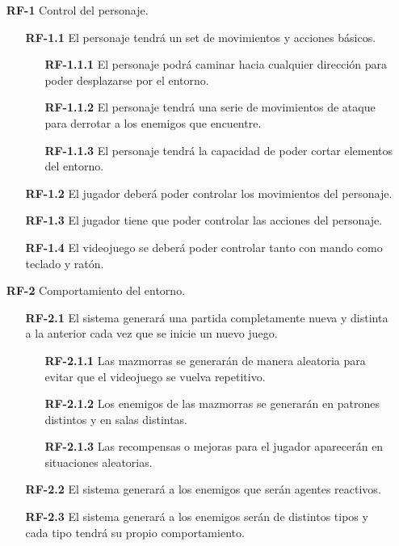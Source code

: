 \begin{enumerate}
    \item[\textbf{RF-1}] Control del personaje.
    \begin{enumerate}
        \item[\textbf{RF-1.1}] El personaje tendrá un set de movimientos y acciones básicos.
        \begin{enumerate}
            \item[\textbf{RF-1.1.1}] El personaje podrá caminar hacia cualquier dirección para poder desplazarse por el entorno.
            \item[\textbf{RF-1.1.2}] El personaje tendrá una serie de  movimientos de ataque para derrotar a los enemigos que encuentre.
            \item[\textbf{RF-1.1.3}] El personaje tendrá la capacidad de poder cortar elementos del entorno.
        \end{enumerate}
        \item[\textbf{RF-1.2}] El jugador deberá poder controlar los movimientos del personaje.
        \item[\textbf{RF-1.3}] El jugador tiene que poder controlar las acciones del personaje.
        \item[\textbf{RF-1.4}] El videojuego se deberá poder controlar tanto con mando como teclado y ratón.
    \end{enumerate}
    \item[\textbf{RF-2}] Comportamiento del entorno.
    \begin{enumerate}
        \item[\textbf{RF-2.1}] El sistema generará una partida completamente nueva y distinta a la anterior cada vez que se inicie un nuevo juego.
        \begin{enumerate}
            \item[\textbf{RF-2.1.1}] Las mazmorras se generarán de manera aleatoria para evitar que el videojuego se vuelva repetitivo.
            \item[\textbf{RF-2.1.2}] Los enemigos de las mazmorras se generarán en patrones distintos y en salas distintas.
            \item[\textbf{RF-2.1.3}] Las recompensas o mejoras para el jugador aparecerán en situaciones aleatorias.
        \end{enumerate}
        \item[\textbf{RF-2.2}] El sistema generará a los enemigos que serán agentes reactivos.
        \item[\textbf{RF-2.3}] El sistema generará a los enemigos serán de distintos tipos y cada tipo tendrá su propio comportamiento.

\end{enumerate}
\end{enumerate}
